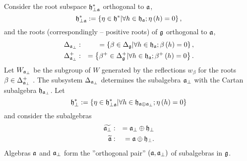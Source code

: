 Consider the root subspace
$\frak{h}_{\perp \mathfrak{a}}^{\ast }$ orthogonal to  $\mathfrak{a}$,
\begin{equation*}
\frak{h}_{\perp \mathfrak{a}}^{\ast }:=\left\{ \eta \in \frak{h}^{\ast }
|\forall h \in \mathfrak{h}_{\mathfrak{a}};  \eta\left(h \right)=0 \right\} ,
\end{equation*}
and the roots (correspondingly -- positive roots) of $\frak{g}$ orthogonal
to $\mathfrak{a}$,
\begin{eqnarray*}
\Delta _{\af_{\perp }} &:&=\left\{ \beta \in \Delta _{\frak{g}}|
\forall h \in \hf_{\af};  \beta\left(h \right)=0  \right\} , \\
\Delta _{\af_{\perp }}^{+} &:&=\left\{ \beta ^{+}\in \Delta _{\frak{g}%
}^{+}|\forall h \in \hf_{\af};  \beta^{+}\left(h \right)=0  \right\} .
\end{eqnarray*}
Let $W_{\mathfrak{a}_{\perp }}$ be the subgroup of $W$ generated by the
reflections $w _{\beta }$ for the roots $\beta \in \Delta _{\af%
_{\perp }}^{+}$ . The subsystem $\Delta _{\mathfrak{a}_{\perp }}$ determines the
subalgebra $\mathfrak{a}_{\perp }$ with the Cartan subalgebra $\frak{h}_{\af%
_{\perp }}$. Let
\begin{equation*}
\frak{h}_{\perp }^{\ast }:=\left\{ \eta \in \frak{h}_{\perp \mathfrak{a}}^{\ast
}|\forall h \in \mathfrak{h}_{\mathfrak{a}\oplus \mathfrak{a}_{\perp}}; \eta \left( h \right)=0 \right\}
\end{equation*}
and consider the subalgebras
\begin{eqnarray*}
\widetilde{\mathfrak{a}_{\perp }} &:&=\mathfrak{a}_{\perp }\oplus \frak{h}_{\perp }
\\
\widetilde{\mathfrak{a}} &:&=\mathfrak{a}\oplus \frak{h}_{\perp }.
\end{eqnarray*}
Algebras $\mathfrak{a}$ and $\mathfrak{a}_{\perp }$ form the ''orthogonal pair''
$\left( \mathfrak{a},\mathfrak{a}_{\perp}\right) $
of subalgebras in $\frak{g}$.

